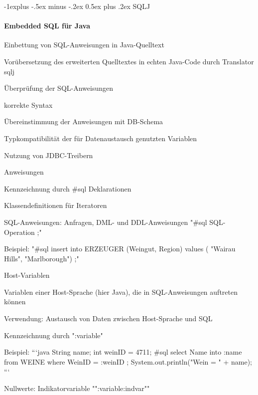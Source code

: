 \documentclass[a4paper]{article}
\makeatletter
\renewcommand{\subsection}{\@startsection{subsection}{2}{0mm}%
                                {-1explus -.5ex minus -.2ex}%
                                {0.5ex plus .2ex}%
                                {\normalfont\normalsize\bfseries}}
\makeatother
\begin{document}
\begin{multicols}{3}
    \subsection{SQLJ}
    \paragraph{Embedded SQL für Java}
    \begin{itemize*}
        \item Einbettung von SQL-Anweisungen in Java-Quelltext
        \item Vorübersetzung des erweiterten Quelltextes in echten Java-Code durch Translator sqlj
        \item Überprüfung der SQL-Anweisungen
        \begin{itemize*}
            \item korrekte Syntax
            \item Übereinstimmung der Anweisungen mit DB-Schema
            \item Typkompatibilität der für Datenaustausch genutzten Variablen
        \end{itemize*}
        \item Nutzung von JDBC-Treibern
    \end{itemize*}

    Anweisungen
    \begin{itemize*}
        \item Kennzeichnung durch \#sql Deklarationen
        \item Klassendefinitionen für Iteratoren
        \item SQL-Anweisungen: Anfragen, DML- und DDL-Anweisungen "\#sql { SQL-Operation };"
        \item Beispiel: "\#sql { insert into ERZEUGER (Weingut, Region) values ( "Wairau Hills", "Marlborough") };"
    \end{itemize*}

    Host-Variablen
    \begin{itemize*}
        \item Variablen einer Host-Sprache (hier Java), die in SQL-Anweisungen auftreten können
        \item Verwendung: Austausch von Daten zwischen Host-Sprache und SQL
        \item Kennzeichnung durch ":variable"
        \item Beispiel:
        ```java
        String name;
        int weinID = 4711;
        \#sql { select Name into :name
        from WEINE where WeinID = :weinID };
        System.out.println("Wein = " + name);
        ```
        \item Nullwerte: Indikatorvariable "":variable:indvar""
    \end{itemize*}


\end{multicols}
\end{document}
